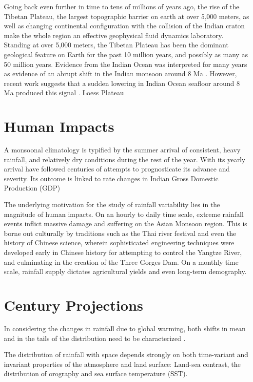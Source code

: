 	Going back even further in time to tens of millions of years ago, the rise of the Tibetan Plateau, the largest topographic barrier on earth at over 5,000 meters, as well as changing continental configuration with the collision of the Indian craton make the whole region an effective geophysical fluid dynamics laboratory. Standing at over 5,000 meters, the Tibetan Plateau has been the dominant geological feature on Earth for the past 10 million years, and possibly as many as 50 million years. Evidence from the Indian Ocean was interpreted for many years as evidence of an abrupt shift in the Indian monsoon around 8 Ma \citep{Harrison1992,Molnar1993}. However, recent work suggests that a sudden lowering in Indian Ocean seafloor around 8 Ma produced this signal \citep{Rodriguez2014}. 
	Loess Plateau

\section{Human Impacts}

A monsoonal climatology is typified by the summer arrival of consistent, heavy rainfall, and relatively dry conditions during the rest of the year. With its yearly arrival have followed centuries of attempts to prognosticate its advance and severity. Its outcome is linked to rate changes in Indian Gross Domestic Production (GDP) \citep{Gadgil}

The underlying motivation for the study of rainfall variability lies in the magnitude of human impacts. On an hourly to daily time scale, extreme rainfall events inflict massive damage and suffering on the Asian Monsoon region. This is borne out culturally by traditions such as the Thai river festival and even the history of Chinese science, wherein sophisticated engineering techniques were developed early in Chinese history for attempting to control the Yangtze River, and culminating in the creation of the Three Gorges Dam. On a monthly time scale, rainfall supply dictates agricultural yields and even long-term demography. 

\section{ Century Projections}
In considering the changes in rainfall due to global warming, both shifts in mean and in the tails of the distribution need to be characterized \cite{Pendergrass}.

The distribution of rainfall with space depends strongly on both time-variant and invariant properties of the atmosphere and land surface: Land-sea contrast, the distribution of orography and sea surface temperature (SST).

